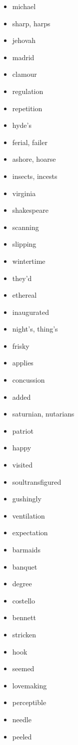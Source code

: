 \documentclass{article}
\begin{document}
\begin{itemize}
    \item michael
    \item sharp, harps
    \item jehovah
    \item madrid
    \item clamour
    \item regulation
    \item repetition
    \item hyde's
    \item ferial, failer
    \item ashore, hoarse
    \item insects, incests
    \item virginia
    \item shakespeare
    \item scanning
    \item slipping
    \item wintertime
    \item they'd
    \item ethereal
    \item inaugurated
    \item night's, thing's
    \item frisky
    \item applies
    \item concussion
    \item added
    \item saturnian, nutarians
    \item patriot
    \item happy
    \item visited
    \item soultransfigured
    \item gushingly
    \item ventilation
    \item expectation
    \item barmaids
    \item banquet
    \item degree
    \item costello
    \item bennett
    \item stricken
    \item hook
    \item seemed
    \item lovemaking
    \item perceptible
    \item needle
    \item peeled

\end{itemize}
\end{document}
